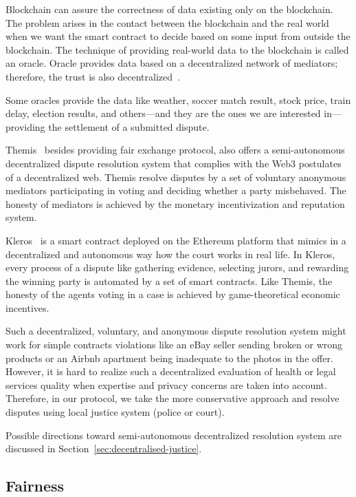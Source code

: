 Blockchain can assure the correctness of data existing only on the blockchain. The problem arises in the contact between the blockchain and the real world when we want the smart contract to decide based on some input from outside the blockchain. The technique of providing real-world data to the blockchain is called an oracle. Oracle provides data based on a decentralized network of mediators; therefore, the trust is also decentralized~\cite{breidenbachChainlinkNextSteps2021}.

Some oracles provide the data like weather, soccer match result, stock
price, train delay, election results, and others—and they are the ones we
are interested in—providing the settlement of a submitted dispute.

Themis~\cite{mengThemisDecentralizedEscrow2019} besides providing fair exchange protocol,
also offers a semi-autonomous decentralized dispute resolution system that complies with the Web3 postulates of a decentralized web. Themis
resolve disputes by a set of voluntary anonymous mediators participating
in voting and deciding whether a party misbehaved. The honesty of
mediators is achieved by the monetary incentivization and reputation
system.

Kleros~\cite{bergollaKlerosSociolegalCase2022} is a smart contract deployed on the Ethereum platform that mimics in a decentralized and autonomous way how the court works in real life. In Kleros, every process of a dispute like gathering evidence, selecting jurors, and rewarding the winning party is automated by a set of smart contracts. Like Themis, the honesty of the agents voting in a case is achieved by game-theoretical economic incentives.

Such a decentralized, voluntary, and anonymous dispute resolution system might work for simple contracts violations like an eBay seller sending broken or wrong products or an Airbnb apartment being inadequate to the photos in the offer. However, it is hard to realize such a decentralized evaluation of health or legal services quality when expertise and privacy concerns are taken into account. Therefore, in our protocol, we take the more conservative approach and resolve disputes using local
justice system (police or court).

Possible directions toward semi-autonomous decentralized resolution system are discussed in Section~\ref{sec:decentralised-justice}.

\subsection{Fairness}\label{fairness}

